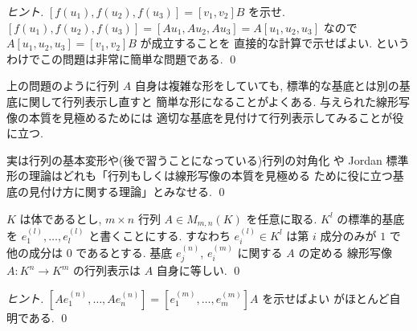 \documentclass[12pt,twoside]{jarticle}
\begin{document}
\begin{proof}[ヒント]
  $[f(u_1),f(u_2),f(u_3)]=[v_1,v_2]B$ を示せ.
  $[f(u_1),f(u_2),f(u_3)]=[Au_1,Au_2,Au_3]=A[u_1,u_2,u_3]$ 
  なので $A[u_1,u_2,u_3]=[v_1,v_2]B$ が成立することを
  直接的な計算で示せばよい.
  というわけでこの問題は非常に簡単な問題である.
  \qed
\end{proof}


\begin{rem}[標準的な基底以外のより適切な基底を見付けることの重要性]
  上の問題のように行列 $A$ 自身は複雑な形をしていても,
  標準的な基底とは別の基底に関して行列表示し直すと
  簡単な形になることがよくある.
  与えられた線形写像の本質を見極めるためには
  適切な基底を見付けて行列表示してみることが役に立つ.

  実は行列の基本変形や(後で習うことになっている)行列の対角化
  や Jordan 標準形の理論はどれも「行列もしくは線形写像の本質を見極める
  ために役に立つ基底の見付け方に関する理論」とみなせる.
  \qed
\end{rem}


\begin{question}[5点]
  \label{q:A->A}
  $K$ は体であるとし, $m\times n$ 行列 $A\in M_{m,n}(K)$ を任意に取る.
  $K^l$ の標準的基底を $e^{(l)}_1,\ldots,e^{(l)}_l$ と書くことにする.
  すなわち $e^{(l)}_i\in K^l$ は第 $i$ 成分のみが $1$ で
  他の成分は $0$ であるとする.
  基底 $e^{(n)}_j$, $e^{(m)}_i$ に関する $A$ の定める
  線形写像 $A:K^n\to K^m$ の行列表示は $A$ 自身に等しい.
  \qed
\end{question}

\begin{proof}[ヒント]
  $[Ae^{(n)}_1,\ldots,Ae^{(n)}_n]=[e^{(m)}_1,\ldots,e^{(m)}_m]A$ を示せばよい
  がほとんど自明である. \qed
\end{proof}

\end{document}
